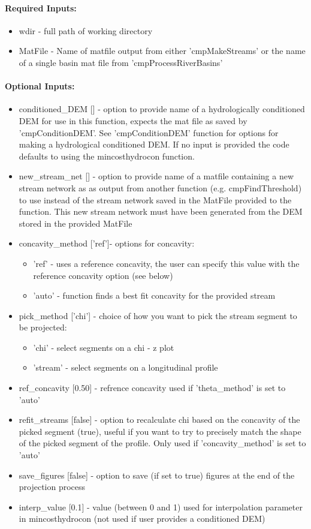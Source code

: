 \paragraph{Required Inputs:}
\begin{itemize}
\item wdir - full path of working directory
\item MatFile - Name of matfile output from either 'cmpMakeStreams' or the name of a single basin mat file from 'cmpProcessRiverBasins'
\end{itemize}

\paragraph{Optional Inputs:}
\begin{itemize}
\item conditioned\_DEM [] - option to provide name of a hydrologically conditioned DEM for use in this function, expects the mat file as saved by 
'cmpConditionDEM'. See 'cmpConditionDEM' function for options for making a hydrological conditioned DEM. If no input is provided the code defaults 
to using the mincosthydrocon function.
\item new\_stream\_net [] - option to provide name of a matfile containing a new stream network as as output from another function (e.g. cmpFindThreshold) to use
instead of the stream network saved in the MatFile provided to the function. This new stream network must have been generated from the
DEM stored in the provided MatFile
\item concavity\_method ['ref']- options for concavity:
\begin{itemize}
\item 'ref' - uses a reference concavity, the user can specify this value with the reference concavity option (see below)
\item 'auto' - function finds a best fit concavity for the provided stream
\end{itemize}
\item pick\_method ['chi'] - choice of how you want to pick the stream segment to be projected:
\begin{itemize}
\item 'chi' - select segments on a chi - z plot
\item 'stream' - select segments on a longitudinal profile
\end{itemize}
\item ref\_concavity [0.50] - refrence concavity used if 'theta\_method' is set to 'auto'
\item refit\_streams [false] - option to recalculate chi based on the concavity of the picked segment (true), useful if you want to try to precisely 
match the shape of the picked segment of the profile. Only used if 'concavity\_method' is set to 'auto'
\item save\_figures [false] - option to save (if set to true) figures at the end of the projection process
\item interp\_value [0.1] - value (between 0 and 1) used for interpolation parameter in mincosthydrocon (not used if user provides a conditioned DEM)
\end{itemize}

